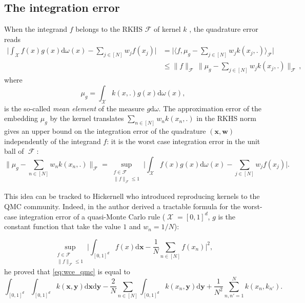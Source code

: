 \documentclass[twoside,11pt]{book}
\DeclareMathOperator{\F}{\mathcal{F}}
\DeclareMathOperator{\X}{\mathcal{X}}
\begin{document}
\subsection{The integration error}
\label{subsec:int_error}
When the integrand $f$ belongs to the RKHS $\mathcal{F}$ of kernel $k$ \citep{CrSh04}, the quadrature error reads \citep{SmGrSoSc07}
\begin{align}
\label{eq:integral_bound_mean_element}
  \bigg|\int_{\mathcal{X}} f(x)g(x)\mathrm{d}\omega(x) - \sum\limits_{j \in [N]} w_{j}f(x_{j}) \bigg|
  & = \bigg|\langle f, \mu_{g} - \sum\limits_{j \in [N]} w_{j} k(x_{j},.) \rangle_{\mathcal{F}} \bigg|\nonumber\\
  & \leq \|f\|_{\mathcal{F}} \, \Big\|\mu_{g} - \sum\limits_{j \in [N]} w_{j} k(x_{j},.)\Big\|_{\mathcal{F}}\,,
\end{align}
where
\begin{equation}
\mu_{g} = \int_{\mathcal{X}} k(x,.) g(x) \mathrm{d}\omega(x),
\end{equation}
 is the so-called \emph{mean element} \citep{DiPi14,MuFuSrSc17} of the measure $g \mathrm{d}\omega$. The approximation error of the embedding $\mu_{g}$ by the kernel translates $\displaystyle \sum\limits_{n \in [N]} w_{n}k(x_{n},.)$ in the RKHS norm gives an upper bound on the integration error of the quadrature $(\bm{x}, \bm{w})$ independently of the integrand $f$: it is the worst case integration error in the unit ball of $\F$:
\begin{equation}\label{eq:wce_kquadrature}
\|\mu_{g} - \sum\limits_{n \in [N]}w_{n} k(x_{n},.) \|_{\mathcal{F}} = \sup\limits_{\substack{f \in \mathcal{F}\\ \|f\|_{\mathcal{F}} \leq 1}} \bigg|\int_{\mathcal{X}} f(x)g(x)\mathrm{d}\omega(x) - \sum\limits_{j \in [N]} w_{j}f(x_{j}) \bigg|.
\end{equation}





This idea can be tracked to Hickernell \citep{Hic96,Hic98} who introduced reproducing kernels to the QMC community. Indeed, in \citep{Hic96} the author derived a tractable formula for the worst-case integration error of a quasi-Monte Carlo rule ($\X=[0,1]^{d}$, $g$ is the constant function that take the value $1$ and $w_{n}= 1/N$):

\begin{equation}\label{eq:wce_qmc}
 \sup\limits_{\substack{f \in \mathcal{F}\\ \|f\|_{\mathcal{F}} \leq 1}} \bigg|\int_{[0,1]^{d}} f(x)\mathrm{d}\bm{x} - \frac{1}{N}\sum\limits_{n \in [N]} f(x_{n}) \bigg|^{2},
\end{equation}
he proved that \eqref{eq:wce_qmc} is equal to 
\begin{equation}\label{eq:wce_qmc_2}
 \int_{[0,1]^{d}}\int_{[0,1]^{d}} k(\bm{x},\bm{y}) \mathrm{d}\bm{x} \mathrm{d}\bm{y} - \frac{2}{N}\sum\limits_{n \in [N]} \int_{[0,1]^{d}} k(x_{n},\bm{y}) \mathrm{d} \bm{y} + \frac{1}{N^2}\sum\limits_{n,n'=1}^{N}k(x_{n},k_{n'}).
\end{equation}
\end{document}
